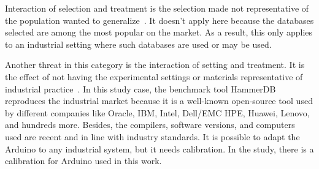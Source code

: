 Interaction of selection and treatment is the selection made not representative of the population wanted to generalize~\cite{10.5555/2349018}. It doesn't apply here because the databases selected are among the most popular on the market. As a result, this only applies to an industrial setting where such databases are used or may be used.



Another threat in this category is the interaction of setting and treatment. It is the effect of not having the experimental settings or materials representative of industrial practice~\cite{10.5555/2349018}. In this study case, the benchmark tool HammerDB reproduces the industrial market because it is a well-known open-source tool used by different companies like Oracle, IBM, Intel, Dell/EMC HPE, Huawei, Lenovo, and hundreds more. Besides, the compilers, software versions, and computers used are recent and in line with industry standards. It is possible to adapt the Arduino to any industrial system, but it needs calibration. In the \citeauthor{portela2016} study, there is a calibration for Arduino used in this work. 




